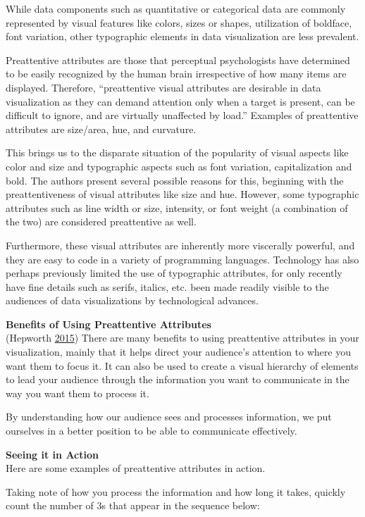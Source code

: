 \documentclass[]{book}
\begin{document}
While data components such as quantitative or categorical data are commonly represented by visual features like colors, sizes or shapes, utilization of boldface, font variation, other typographic elements in data visualization are less prevalent.

Preattentive attributes are those that perceptual psychologists have determined to be easily recognized by the human brain irrespective of how many items are displayed. Therefore, ``preattentive visual attributes are desirable in data visualization as they can demand attention only when a target is present, can be difficult to ignore, and are virtually unaffected by load.'' Examples of preattentive attributes are size/area, hue, and curvature.

This brings us to the disparate situation of the popularity of visual aspects like color and size and typographic aspects such as font variation, capitalization and bold. The authors present several possible reasons for this, beginning with the preattentiveness of visual attributes like size and hue. However, some typographic attributes such as line width or size, intensity, or font weight (a combination of the two) are considered preattentive as well.

Furthermore, these visual attributes are inherently more viscerally powerful, and they are easy to code in a variety of programming languages. Technology has also perhaps previously limited the use of typographic attributes, for only recently have fine details such as serifs, italics, etc. been made readily visible to the audiences of data visualizations by technological advances.

\textbf{Benefits of Using Preattentive Attributes}\\
(Hepworth \protect\hyperlink{ref-kathep}{2015})
There are many benefits to using preattentive attributes in your visualization, mainly that it helps direct your audience's attention to where you want them to focus it. It can also be used to create a visual hierarchy of elements to lead your audience through the information you want to communicate in the way you want them to process it.

By understanding how our audience sees and processes information, we put ourselves in a better position to be able to communicate effectively.

\textbf{Seeing it in Action}\\
Here are some examples of preattentive attributes in action.

Taking note of how you process the information and how long it takes, quickly count the number of 3s that appear in the sequence below:\\
\end{document}
